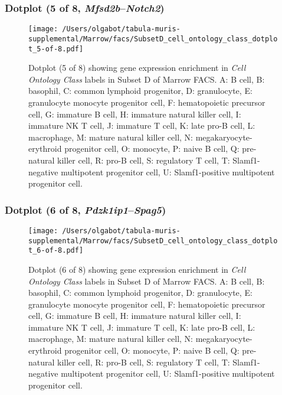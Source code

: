 \subsubsection{Dotplot (5 of 8, \emph{Mfsd2b}--\emph{Notch2})}
\begin{figure}[h]
\centering
\texttt{[image: /Users/olgabot/tabula-muris-supplemental/Marrow/facs/SubsetD\_cell\_ontology\_class\_dotplot\_5-of-8.pdf]}

\caption{ Dotplot (5 of 8)  showing gene expression enrichment in \emph{Cell Ontology Class} labels in Subset D of Marrow FACS. A: B cell, B: basophil, C: common lymphoid progenitor, D: granulocyte, E: granulocyte monocyte progenitor cell, F: hematopoietic precursor cell, G: immature B cell, H: immature natural killer cell, I: immature NK T cell, J: immature T cell, K: late pro-B cell, L: macrophage, M: mature natural killer cell, N: megakaryocyte-erythroid progenitor cell, O: monocyte, P: naive B cell, Q: pre-natural killer cell, R: pro-B cell, S: regulatory T cell, T: Slamf1-negative multipotent progenitor cell, U: Slamf1-positive multipotent progenitor cell.}
\end{figure}


\clearpage

\subsubsection{Dotplot (6 of 8, \emph{Pdzk1ip1}--\emph{Spag5})}
\begin{figure}[h]
\centering
\texttt{[image: /Users/olgabot/tabula-muris-supplemental/Marrow/facs/SubsetD\_cell\_ontology\_class\_dotplot\_6-of-8.pdf]}

\caption{ Dotplot (6 of 8)  showing gene expression enrichment in \emph{Cell Ontology Class} labels in Subset D of Marrow FACS. A: B cell, B: basophil, C: common lymphoid progenitor, D: granulocyte, E: granulocyte monocyte progenitor cell, F: hematopoietic precursor cell, G: immature B cell, H: immature natural killer cell, I: immature NK T cell, J: immature T cell, K: late pro-B cell, L: macrophage, M: mature natural killer cell, N: megakaryocyte-erythroid progenitor cell, O: monocyte, P: naive B cell, Q: pre-natural killer cell, R: pro-B cell, S: regulatory T cell, T: Slamf1-negative multipotent progenitor cell, U: Slamf1-positive multipotent progenitor cell.}
\end{figure}


\clearpage

